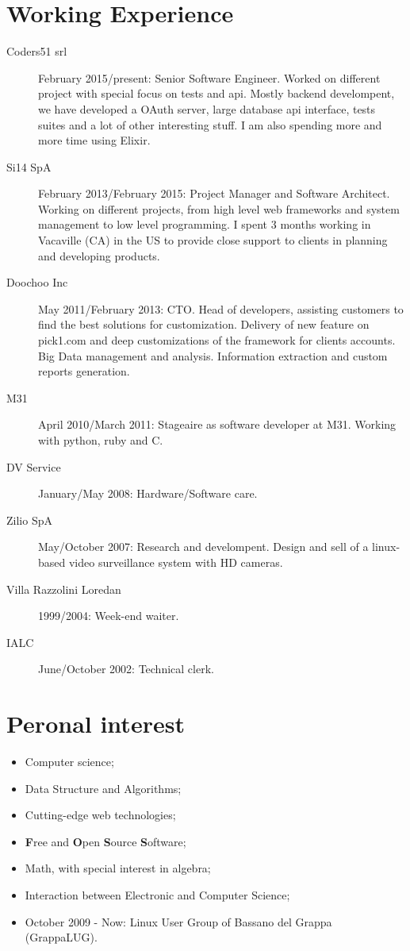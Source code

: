 \documentclass[pdftex, a4paper, 11pt]{article}
\begin{document}
\section*{Working Experience}
\begin{description}
\item[Coders51 srl] February 2015/present: Senior Software Engineer. Worked on different project
  with special focus on tests and api. Mostly backend develompent, we have developed a OAuth server,
  large database api interface, tests suites and a lot of other interesting stuff.
  I am also spending more and more time using Elixir.
\item[Si14 SpA] February 2013/February 2015: Project Manager and Software Architect.
    Working on different projects, from high level web frameworks and system management
    to low level programming. I spent 3 months working in Vacaville (CA) in the US
    to provide close support to clients in planning and developing products.
\item[Doochoo Inc] May 2011/February 2013: CTO. Head of developers, assisting
  customers to find the best solutions for customization.
  Delivery of new feature on pick1.com and deep customizations of the framework
  for clients accounts. Big Data management and analysis. Information extraction and
  custom reports generation.
\item[M31] April 2010/March 2011: Stageaire as software developer at M31. Working with python, ruby and C.
\item[DV Service] January/May 2008: Hardware/Software care.
\item[Zilio SpA] May/October 2007: Research and develompent. Design and
  sell of a linux-based video surveillance system with HD cameras.
\item[Villa Razzolini Loredan] 1999/2004: Week-end waiter.
\item[IALC] June/October 2002: Technical clerk.
\end{description}

\section*{Peronal interest}
\begin{itemize}
\item Computer science;
\item Data Structure and Algorithms;
\item Cutting-edge web technologies;
\item {\bf F}ree and {\bf O}pen {\bf S}ource {\bf S}oftware;
\item Math, with special interest in algebra;
\item Interaction between Electronic and Computer Science;
\item October 2009 - Now: Linux User Group of Bassano del Grappa (GrappaLUG).
\end{itemize}
\end{document}
